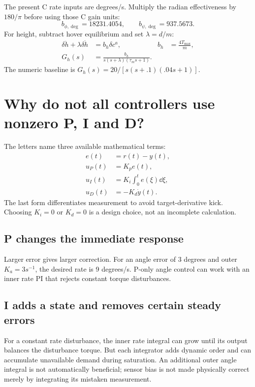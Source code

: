 The present C rate inputs are degrees/s. Multiply the radian effectiveness by
$180/\pi$ before using those C gain units:
\begin{equation}
b_{\phi,\deg}=18231.4054,\qquad b_{\psi,\deg}=937.5673.
\end{equation}
For height, subtract hover equilibrium and set $\lambda=d/m$:
\begin{align}
\delta\ddot h+\lambda\delta\dot h&=b_h\delta c^a,&b_h&=\frac{4T_{\max}}m,\\
G_h(s)&=\frac{b_h}{s(s+\lambda)(\tau_ms+1)}.
\end{align}
The numeric baseline is
$G_h(s)=20/[s(s+.1)(.04s+1)]$.

\section{Why do not all controllers use nonzero P, I and D?}
The letters name three available mathematical terms:
\begin{align}
e(t)&=r(t)-y(t),\\
u_P(t)&=K_pe(t),\\
u_I(t)&=K_i\int_0^t e(\xi)\dd\xi,\\
u_D(t)&=-K_d\dot y(t).
\end{align}
The last form differentiates measurement to avoid target-derivative kick.
Choosing $K_i=0$ or $K_d=0$ is a design choice, not an incomplete calculation.

\subsection{P changes the immediate response}
Larger error gives larger correction. For an angle error of 3 degrees and outer
$K_a=3\unit{s^{-1}}$, the desired rate is 9 degrees/s. P-only angle control can
work with an inner rate PI that rejects constant torque disturbances.

\subsection{I adds a state and removes certain steady errors}
For a constant rate disturbance, the inner rate integral can grow until its
output balances the disturbance torque. But each integrator adds dynamic order
and can accumulate unavailable demand during saturation. An additional outer
angle integral is not automatically beneficial; sensor bias is not made physically
correct merely by integrating its mistaken measurement.

